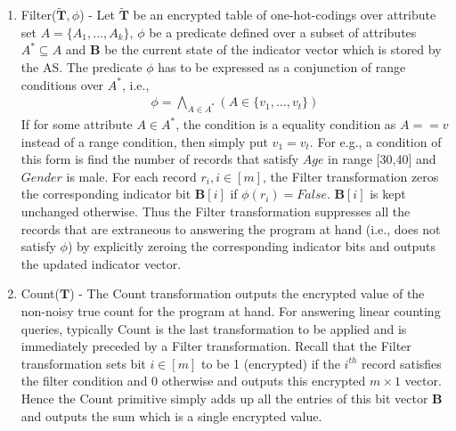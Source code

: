 {\begin{enumerate}
  \item \textsf{Filter}($\tilde{\mathbf{T}},\phi$) - Let $\tilde{\mathbf{T}}$ be an encrypted table of one-hot-codings over attribute set $A=\{A_1,...,A_k\}$, $\phi$ be a  predicate defined over a subset of attributes $A^*\subseteq A$ and $\mathbf{B}$ be the current state of the indicator vector which is stored by the \textsf{AS}. The predicate $\phi$ has to be expressed as a conjunction of range conditions over $A^*$, i.e.,\begin{gather}\phi = \bigwedge_{A \in A^*}(A \in \{v_{1},\ldots,v_{t}\} ) \label{phi} \end{gather} If for some attribute $A \in A^*$, the condition is a equality condition as $A==v$ instead of a range condition, then simply put $v_1=v_t$. For e.g., a condition of this form is find the number of records that satisfy $Age$ in range [30,40] and $Gender$ is male. For each record $r_i, i \in [m]$, the Filter transformation zeros the corresponding indicator bit $\mathbf{B}[i] $ if $\phi(r_i)=False$. $\mathbf{B}[i] $ is kept unchanged otherwise. Thus the \textsf{Filter} transformation suppresses all the records that are extraneous to answering the program at hand (i.e., does not satisfy $\phi$) by explicitly zeroing the corresponding indicator bits and outputs the updated indicator vector. %
    \item{\textsf{Count}($\mathbf{T}$) } - The \textsf{Count} transformation outputs the encrypted value of the non-noisy true count for the program at hand. For answering linear counting queries, typically \textsf{Count}  is the last transformation to be applied and is immediately preceded by a \textsf{Filter} transformation. Recall that the \textsf{Filter} transformation sets bit $i \in [m]$ to be 1 (encrypted) if the $i^{th}$ record satisfies the filter condition and 0 otherwise and outputs this encrypted $m\times 1$ vector. Hence the \textsf{Count} primitive simply adds up all the entries of this bit vector $\mathbf{B}$ and  outputs the sum which is a single encrypted value. 

\end{enumerate}}
